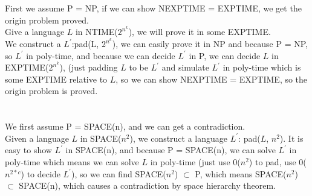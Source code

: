 \documentclass[11pt]{article}
\begin{document}
\part{}
First we assume P = NP, if we can show NEXPTIME = EXPTIME, we get the origin problem proved. \\
Give a language $L$ in NTIME($2^{n^{k}}$), we will prove it in some EXPTIME. \\
We construct a $L^{'}$:pad(L, $2^{n^{k}}$), we can easily prove it in NP and because P = NP, so $L^{'}$ in poly-time, and because we can decide 
$L^{'}$ in P, we can decide $L$ in EXPTIME($2^{n^{k}}$), (just padding $L$ to be $L^{'}$ and simulate $L^{'}$ in poly-time which is some EXPTIME relative to $L$, so we can show NEXPTIME = EXPTIME, so the origin problem is proved.
\part{}
We first assume P = SPACE(n), and we can get a contradiction. \\
Given a language $L$ in SPACE($n^{2}$), we construct a language $L^{'}$: pad($L$, $n^{2}$). It is easy to show $L^{'}$ in SPACE(n), and because P = SPACE(n), we can solve $L^{'}$ in poly-time which means we can solve $L$ in poly-time (just use 0($n^{2}$) to pad, use 0($n^{2*c}$) to decide $L^{'}$), so we can find SPACE($n^{2}$) $\subset$ P, which means SPACE($n^{2}$) $\subset$ SPACE(n), which causes a contradiction by space hierarchy theorem. 
\end{document}
